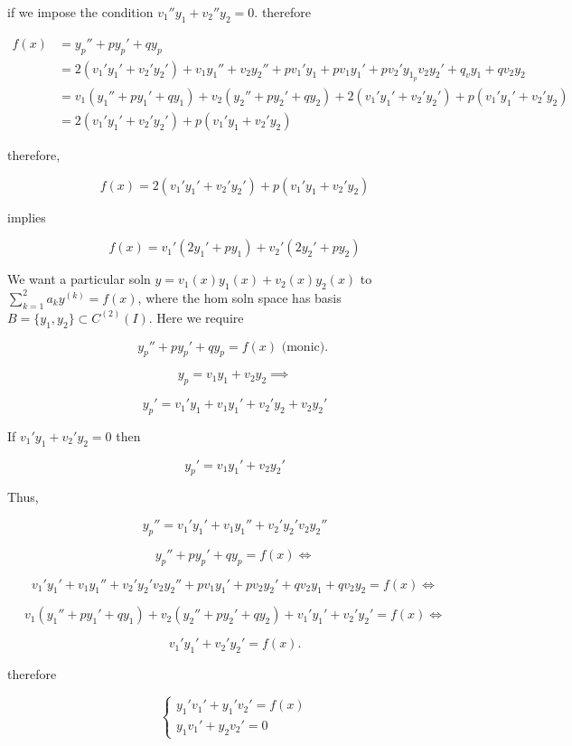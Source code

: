if we impose the condition \( v_1''y_1 + v_2''y_2 = 0. \) therefore 

\begin{align*}
  f(x) &= y_p'' + py_p' + qy_p \\
  &= 2(v_1'y_1' + v_2'y_2') + v_1y_1'' + v_2y_2'' +
  pv_1'y_1 + pv_1y_1' + pv_2'y_1 _ pv_2y_2' + q_vy_1 + qv_2y_2\\
  &= v_1(y_1'' + py_1' +qy_1) + v_2(y_2'' + py_2' +qy_2) + 2(v_1'y_1' +
  v_2'y_2') + p(v_1'y_1'+v_2'y_2) \\
  &= 2(v_1'y_1' + v_2'y_2') + p(v_1'y_1 + v_2'y_2)
\end{align*}

therefore, 

\[ f(x) =  2(v_1'y_1' + v_2'y_2') + p(v_1'y_1 + v_2'y_2)
\]

implies 

\[ f(x) = v_1'(2y_1' +py_1) + v_2'(2y_2' +py_2) \]


\newpage
{}

We want a particular soln \( y = v_1(x) y_1(x) + v_2(x) y_2(x) \) to \(
\sum_{k=1}^{2} a_k y^{(k)} = f(x) \), where the hom soln space has basis
\( B = \{ y_1, y_2 \}  \subset C^{(2)}(I) \). Here we require 

\[  y_p'' + py_p' + qy_p = f(x) \text{ (monic). } \]

\[ y_p = v_1y_1 + v_2y_2 \implies \]

\[ y_p' = v_1'y_1 + v_1y_1' + v_2'y_2 + v_2y_2' \]

If \( v_1'y_1 + v_2'y_2 = 0 \) then 

\[ y_p' = v_1y_1' + v_2y_2' \]

Thus, 

\[ y_p'' = v_1'y_1' + v_1y_1'' + v_2'y_2' v_2y_2'' \]

\[ y_p'' +py_p' + qy_p = f(x) \iff \]

\[ v_1'y_1' + v_1y_1'' + v_2'y_2' v_2y_2'' + pv_1y_1' + pv_2y_2' +
qv_2y_1 + qv_2y_2 = f(x) \iff \]

\[ v_1(y_1'' + py_1' + qy_1) + v_2(y_2'' + py_2' + qy_2) + v_1' y_1' +
v_2'y_2' = f(x) \iff \]

\[ v_1'y_1' + v_2'y_2' = f(x). \]

therefore

\[
\begin{cases}
  y_1' v_1' + y_1'v_2' = f(x) \\
  y_1v_1' + y_2v_2' = 0
\end{cases}
\]

